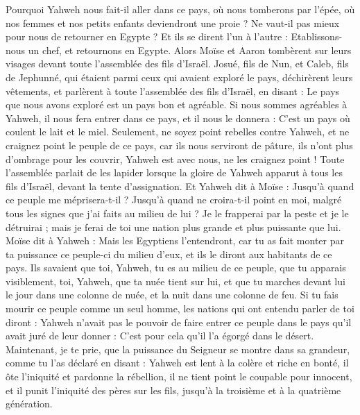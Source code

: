 \begin{multicols}{2}
Pourquoi Yahweh nous fait-il aller dans ce pays, où nous tomberons par l'épée, où nos femmes et nos petits enfants deviendront une proie ? Ne vaut-il pas mieux pour nous de retourner en Egypte ?
Et ils se dirent l'un à l'autre : Etablissons-nous un chef, et retournons en Egypte.
Alors Moïse et Aaron tombèrent sur leurs visages devant toute l'assemblée des fils d'Israël.
Josué, fils de Nun, et Caleb, fils de Jephunné, qui étaient parmi ceux qui avaient exploré le pays, déchirèrent leurs vêtements,
et parlèrent à toute l'assemblée des fils d'Israël, en disant : Le pays que nous avons exploré est un pays bon et agréable.
Si nous sommes agréables à Yahweh, il nous fera entrer dans ce pays, et il nous le donnera : C'est un pays où coulent le lait et le miel.
Seulement, ne soyez point rebelles contre Yahweh, et ne craignez point le peuple de ce pays, car ils nous serviront de pâture, ils n’ont plus d’ombrage pour les couvrir, Yahweh est avec nous, ne les craignez point !
Toute l'assemblée parlait de les lapider lorsque la gloire de Yahweh apparut à tous les fils d'Israël, devant la tente d'assignation.
Et Yahweh dit à Moïse : Jusqu’à quand ce peuple me méprisera-t-il ? Jusqu’à quand ne croira-t-il point en moi, malgré tous les signes que j'ai faits au milieu de lui ?
Je le frapperai par la peste et je le détruirai ; mais je ferai de toi une nation plus grande et plus puissante que lui.
Moïse dit à Yahweh : Mais les Egyptiens l'entendront, car tu as fait monter par ta puissance ce peuple-ci du milieu d'eux,
et ils le diront aux habitants de ce pays. Ils savaient que toi, Yahweh, tu es au milieu de ce peuple, que tu apparais visiblement, toi, Yahweh, que ta nuée tient sur lui, et que tu marches devant lui le jour dans une colonne de nuée, et la nuit dans une colonne de feu.
Si tu fais mourir ce peuple comme un seul homme, les nations qui ont entendu parler de toi diront :
Yahweh n’avait pas le pouvoir de faire entrer ce peuple dans le pays qu’il avait juré de leur donner : C’est pour cela qu’il l’a égorgé dans le désert.
Maintenant, je te prie, que la puissance du Seigneur se montre dans sa grandeur, comme tu l’as déclaré en disant :
Yahweh est lent à la colère et riche en bonté, il ôte l'iniquité et pardonne la rébellion, il ne tient point le coupable pour innocent, et il punit l'iniquité des pères sur les fils, jusqu'à la troisième et à la quatrième génération.

\end{multicols}

